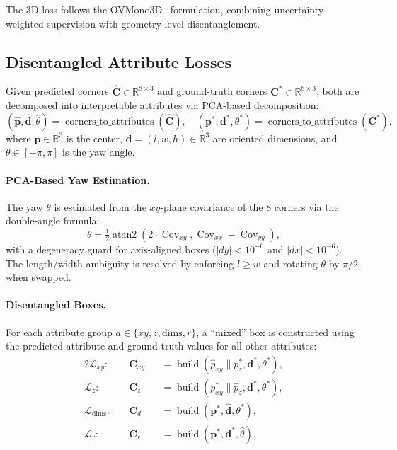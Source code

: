 \documentclass[runningheads]{llncs}
\newcommand{\mR}{\mathbb{R}}
\newcommand{\op}[1]{\operatorname{#1}}
\newcommand{\mat}[1]{\bm{#1}}
\begin{document}
The 3D loss follows the OVMono3D~\cite{zhang2023ovmono3d} formulation, combining uncertainty-weighted supervision with geometry-level disentanglement.

\subsection{Disentangled Attribute Losses}
\label{sec:disentangled}

Given predicted corners $\hat{\mat{C}} \in \mR^{8 \times 3}$ and ground-truth corners $\mat{C}^* \in \mR^{8 \times 3}$, both are decomposed into interpretable attributes via PCA-based decomposition:
\begin{equation}
    (\hat{\mat{p}}, \hat{\mat{d}}, \hat{\theta}) = \op{corners\_to\_attributes}(\hat{\mat{C}}), \quad
    (\mat{p}^*, \mat{d}^*, \theta^*) = \op{corners\_to\_attributes}(\mat{C}^*),
    \label{eq:decompose}
\end{equation}
where $\mat{p} \in \mR^3$ is the center, $\mat{d} = (l, w, h) \in \mR^3$ are oriented dimensions, and $\theta \in [-\pi, \pi]$ is the yaw angle.

\paragraph{PCA-Based Yaw Estimation.}  The yaw $\theta$ is estimated from the $xy$-plane covariance of the 8 corners via the double-angle formula:
\begin{equation}
    \theta = \tfrac{1}{2} \op{atan2}(2 \cdot \op{Cov}_{xy}, \op{Cov}_{xx} - \op{Cov}_{yy}),
    \label{eq:pca_yaw}
\end{equation}
with a degeneracy guard for axis-aligned boxes ($|dy| < 10^{-6}$ and $|dx| < 10^{-6}$).  The length/width ambiguity is resolved by enforcing $l \geq w$ and rotating $\theta$ by $\pi/2$ when swapped.

\paragraph{Disentangled Boxes.}  For each attribute group $a \in \{xy, z, \text{dims}, r\}$, a ``mixed'' box is constructed using the predicted attribute and ground-truth values for all other attributes:
\begin{alignat}{2}
    \mathcal{L}_{xy}:& \quad \mat{C}_{xy} &&= \op{build}(\hat{p}_{xy} \| p_z^*, \mat{d}^*, \theta^*), \label{eq:l_xy} \\
    \mathcal{L}_{z}:& \quad \mat{C}_{z} &&= \op{build}(p_{xy}^* \| \hat{p}_z, \mat{d}^*, \theta^*), \label{eq:l_z} \\
    \mathcal{L}_{\text{dims}}:& \quad \mat{C}_d &&= \op{build}(\mat{p}^*, \hat{\mat{d}}, \theta^*), \label{eq:l_dims} \\
    \mathcal{L}_{r}:& \quad \mat{C}_r &&= \op{build}(\mat{p}^*, \mat{d}^*, \hat{\theta}). \label{eq:l_r}
\end{alignat}
\end{document}
